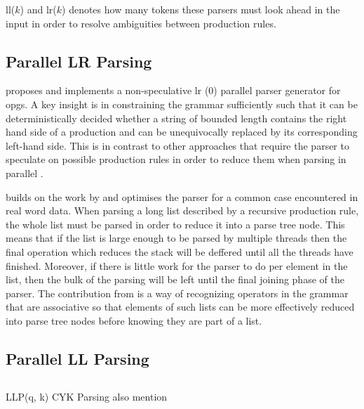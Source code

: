 \gls{ll}($k$) and \gls{lr}($k$) denotes how many tokens these parsers must look
ahead in the input in order to resolve ambiguities between production rules.

\subsection{Parallel LR Parsing}

\cite{barenghi_parallel_2015} proposes and implements a non-speculative \gls{lr}
(0) parallel parser generator for \gls{opg}s. A key insight is in constraining
the grammar sufficiently such that it can be deterministically decided whether
a string of bounded length contains the right hand side of a production
and can be unequivocally replaced by its corresponding left-hand side. This
is in contrast to other approaches that require the parser to speculate on
possible production rules in order to reduce them when parsing in parallel
\citep{mickunas_parallel_1978}.

\cite{li_associative_2023} builds on the work by \cite{barenghi_parallel_2015}
and optimises the parser for a common case encountered in real word data. When
parsing a long list described by a recursive production rule, the whole list
must be parsed in order to reduce it into a parse tree node. This means that
if the list is large enough to be parsed by multiple threads then the final
operation which reduces the stack will be deffered until all the threads have
finished. Moreover, if there is little work for the parser to do per element
in the list, then the bulk of the parsing will be left until the final joining
phase of the parser. The contribution from \cite{li_associative_2023} is a way
of recognizing operators in the grammar that are associative so that elements of
such lists can be more effectively reduced into parse tree nodes before knowing
they are part of a list.

\subsection{Parallel LL Parsing} 



\subsection{}
\begin{roughwork}
    LLP(q, k) \cite{robin_voetter_parallel_2021}
    \newline \newline
    CYK Parsing \cite{skrzypczak_parallel_nodate}
    \newline \newline
    also mention \cite{mark_thierry_vandevoorde_parallel_1988, alblas_bibliography_1994}
\end{roughwork}


